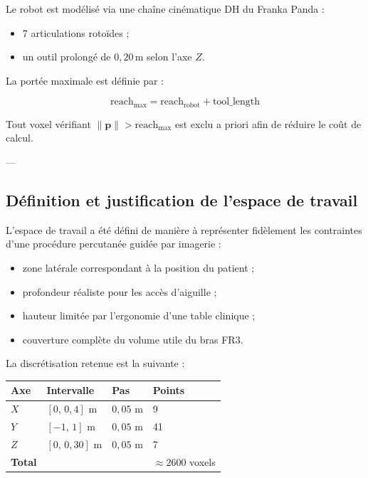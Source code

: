 \documentclass[11pt, a4paper]{article}
\begin{document}
Le robot est modélisé via une chaîne cinématique DH du Franka Panda :

\begin{itemize}
  \item 7 articulations rotoïdes ;
  \item un outil prolongé de $0{,}20$\,m selon l’axe $Z$.
\end{itemize}

La portée maximale est définie par :

\begin{equation}
  \text{reach}_{\max} = \text{reach}_{\text{robot}} + \text{tool\_length}
\end{equation}

Tout voxel vérifiant $\|\mathbf{p}\| > \text{reach}_{\max}$ est exclu a priori afin de réduire le coût de calcul.

---

\subsection{Définition et justification de l’espace de travail}

L’espace de travail a été défini de manière à représenter fidèlement les contraintes d’une procédure percutanée guidée par imagerie :

\begin{itemize}
  \item zone latérale correspondant à la position du patient ;
  \item profondeur réaliste pour les accès d’aiguille ;
  \item hauteur limitée par l’ergonomie d’une table clinique ;
  \item couverture complète du volume utile du bras FR3.
\end{itemize}

La discrétisation retenue est la suivante :

\begin{center}
\begin{tabular}{llll}
\toprule
\rowcolor{LightBlue}
\textbf{Axe} & \textbf{Intervalle} & \textbf{Pas} & \textbf{Points} \\
\midrule
$X$ & $[0,\,0{,}4]$ m & $0{,}05$ m & 9 \\
$Y$ & $[-1,\,1]$ m & $0{,}05$ m & 41 \\
$Z$ & $[0,\,0{,}30]$ m & $0{,}05$ m & 7 \\
\midrule
\textbf{Total} & & & $\approx 2600$ voxels \\
\bottomrule
\end{tabular}
\end{center}
\end{document}
